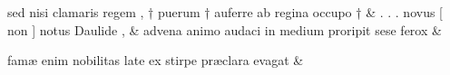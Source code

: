 \documentclass[12pt,onecolumn,twoside,a4paper]{memoir}
\begin{document}
\begin{pairs}
\begin{Leftside}
                              sed
                              nisi
                              clamaris
                              regem
                              ,
                              †
                              puerum
                              †
                              auferre
                              ab
                              regina
                              occupo
                              † \&
                         \stanza {}.
                              .
                              .
                              novus
                              [
                              non
                              ]
                              notus
                              Daulide
                              , & 
                     advena
                              animo
                              audaci
                              in
                              medium
                              proripit
                              sese
                              ferox \&
                         \stanza {}
                     
                              famæ
                              enim
                              nobilitas
                              late
                              ex
                              stirpe
                              præclara
                              evagat \&

                     
                  \endnumbering
		\end{Leftside}
                  \begin{Rightside}
			\beginnumbering
			\numberstanzafalse
                     

\end{Rightside}
\end{pairs}
\end{document}

